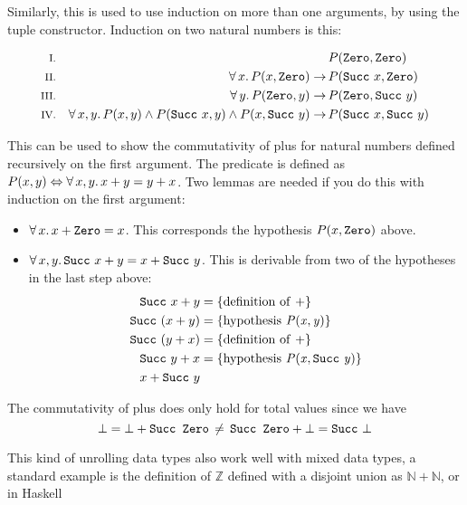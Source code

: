 Similarly, this is used to use induction on more than one arguments,
by using the tuple constructor. Induction on two natural numbers is this:

\begin{align*}
\rom{1} &&                                                                                        & P(\hs{Zero}     ,\hs{Zero}     ) \\
\rom{2} && \fa{x} P(x,\hs{Zero})                                                   \rightarrow \, & P(\hs{Succ} \w x,\hs{Zero}     ) \\
\rom{3} && \fa{y} P(\hs{Zero},y)                                                   \rightarrow \, & P(\hs{Zero}     ,\hs{Succ} \w y) \\
\rom{4} && \faa{x}{y} P(x,y) \wedge P(\hs{Succ} \w x,y) \wedge P(x,\hs{Succ} \w y) \rightarrow \, & P(\hs{Succ} \w x,\hs{Succ} \w y) \\
\end{align*}

This can be used to show the commutativity of plus for natural numbers
defined recursively on the first argument. The predicate is defined as
$P(x,y) \Leftrightarrow \forall \, x , y . \, x + y = y + x$. Two lemmas are
needed if you do this with induction on the first argument:
\begin{itemize}
  \item $\fa{x} x + \hs{Zero} = x$. This corresponds the hypothesis
    $P(x,\hs{Zero})$ above.
  \item $\faa{x}{y} \hs{Succ} \w x + y = x + \hs{Succ} \w y$. This is
    derivable from two of the hypotheses in the last step above:
    \begin{align*}
    \hs{Succ} \w x + y   & = \{\mathrm{definition \w of \w \mathit{+}}\} \\
    \hs{Succ} \w (x + y) & = \{\mathrm{hypothesis \w \mathit{P(x,y)}}\} \\
    \hs{Succ} \w (y + x) & = \{\mathrm{definition \w of \w \mathit{+}}\} \\
    \hs{Succ} \w y + x   & = \{\mathrm{hypothesis \w \mathit{P(x,\hs{Succ} \w y)}}\} \\
    x + \hs{Succ} \w y
    \end{align*}
\end{itemize}

The commutativity of plus does only hold for total values since we have
$$\bot \eq \bot + \hs{Succ Zero} \, \neq \, \hs{Succ Zero} + \bot \eq \hs{Succ} \w \bot$$

This kind of unrolling data types also work well with mixed data
types, a standard example is the definition of $\mathbb{Z}$ defined
with a disjoint union as $\mathbb{N} + \mathbb{N}$, or in Haskell

